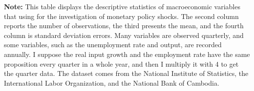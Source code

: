 \begin{table}[H]
	\centering
	\caption{Summary statistics for macroeconomic variables}
	\label{app:tabm1}
	\begin{tablenotes}
	\footnotesize
	\item \textbf{Note:} This table displays the descriptive statistics of macroeconomic variables that using for the investigation of monetary policy shocks. The second column reports the number of observations, the third presents the mean, and the fourth column is standard deviation errors. Many variables are observed quarterly, and some variables, such as the unemployment rate and output, are recorded annually. I suppose the real input growth and the employment rate have the same proposition every quarter in a whole year, and then I multiply it with 4 to get the quarter data. The dataset comes from the National Institute of Statistics, the International Labor Organization, and the National Bank of Cambodia.       

	\end{tablenotes} 
	
\end{table}